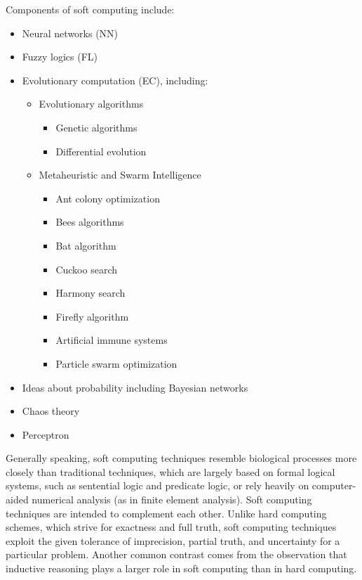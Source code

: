 \documentclass[12pt]{article} %
\begin{document}
Components of soft computing include:
\begin{itemize}

\item{Neural networks (NN)}
\item{Fuzzy logics (FL)}
\item{Evolutionary computation (EC), including:}
\begin{itemize}
\item{Evolutionary algorithms}
\begin{itemize}
\item{Genetic algorithms}
\item{Differential evolution}
\end{itemize}
\item{Metaheuristic and Swarm Intelligence}
\begin{itemize}
\item{Ant colony optimization}
\item{Bees algorithms}
\item{Bat algorithm}
\item{Cuckoo search}
\item{Harmony search}
\item{Firefly algorithm}
\item{Artificial immune systems}
\item{Particle swarm optimization}
\end{itemize}
\end{itemize}
\item{Ideas about probability including Bayesian networks}
\item{Chaos theory}
\item{Perceptron}

\end{itemize}
Generally speaking, soft computing techniques resemble biological processes more closely than traditional techniques, which are largely based on formal logical systems, such as sentential logic and predicate logic, or rely heavily on computer-aided numerical analysis (as in finite element analysis). Soft computing techniques are intended to complement each other.
Unlike hard computing schemes, which strive for exactness and full truth, soft computing techniques exploit the given tolerance of imprecision, partial truth, and uncertainty for a particular problem. Another common contrast comes from the observation that inductive reasoning plays a larger role in soft computing than in hard computing.
\end{document}
